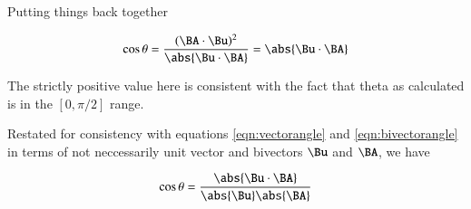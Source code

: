 \documentclass{article}      %
\begin{document}
Putting things back together

\begin{equation*}
\cos\theta
= \frac{(\BA \cdot \Bu)^2}{\abs{\Bu \cdot \BA}} = \abs{\Bu \cdot \BA}
\end{equation*}

The strictly positive value here is consistent with the fact that theta as calculated is in the $[0,\pi/2]$ range.

Restated for consistency with equations \ref{eqn:vectorangle} and \ref{eqn:bivectorangle} in terms of not neccessarily 
unit vector and bivectors $\Bu$ and $\BA$, we have

\begin{equation}
\cos\theta = 
\frac{\abs{\Bu \cdot \BA}}{ \abs{\Bu} \abs{\BA} }
\end{equation}
\end{document}

